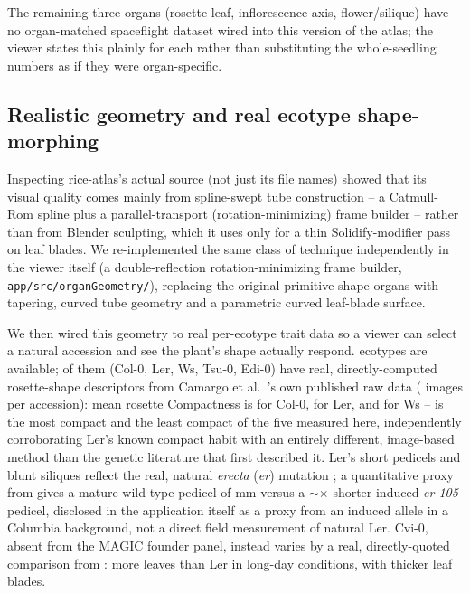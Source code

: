 The remaining three organs (rosette leaf, inflorescence axis, flower/silique) have no
organ-matched spaceflight dataset wired into this version of the atlas; the viewer states
this plainly for each rather than substituting the whole-seedling numbers as if they were
organ-specific.

\subsection{Realistic geometry and real ecotype shape-morphing}

Inspecting rice-atlas's actual source (not just its file names) showed that its visual
quality comes mainly from spline-swept tube construction -- a Catmull-Rom spline plus a
parallel-transport (rotation-minimizing) frame builder -- rather than from Blender
sculpting, which it uses only for a thin Solidify-modifier pass on leaf blades. We
re-implemented the same class of technique independently in the viewer itself (a
double-reflection rotation-minimizing frame builder, \texttt{app/src/organGeometry/}),
replacing the original primitive-shape organs with tapering, curved tube geometry and a
parametric curved leaf-blade surface.

We then wired this geometry to real per-ecotype trait data so a viewer can select a
natural accession and see the plant's shape actually respond. \NumEcotypes{} ecotypes are
available; \NumMagicFounderEcotypesUsed{} of them (Col-0, Ler, Ws, Tsu-0, Edi-0) have real,
directly-computed rosette-shape descriptors from Camargo et al.\ \citeyearpar{Camargo2014}'s
own published raw data (\NRosetteImagesPerEcotype{} images per accession): mean rosette
Compactness is \ColZeroCompactness{} for Col-0, \LerCompactness{} for Ler, and
\WsCompactness{} for Ws -- \MostCompactEcotype{} is the most compact and
\LeastCompactEcotype{} the least compact of the five measured here, independently
corroborating Ler's known compact habit with an entirely different, image-based method
than the genetic literature that first described it. Ler's short pedicels and blunt
siliques reflect the real, natural \textit{erecta} (\textit{er}) mutation
\citep{Torii1996}; a quantitative proxy from \citet{Bundy2012} gives a mature wild-type
pedicel of \PedicelWildTypeMm{}mm versus a $\sim$\PedicelErShorteningFold{}$\times$ shorter
induced \textit{er-105} pedicel, disclosed in the application itself as a proxy from an
induced allele in a Columbia background, not a direct field measurement of natural Ler.
Cvi-0, absent from the MAGIC founder panel, instead varies by a real, directly-quoted
comparison from \citet{Coneva2018}: \CviExtraLeavesVsLer{} more leaves than Ler in
long-day conditions, with thicker leaf blades.

